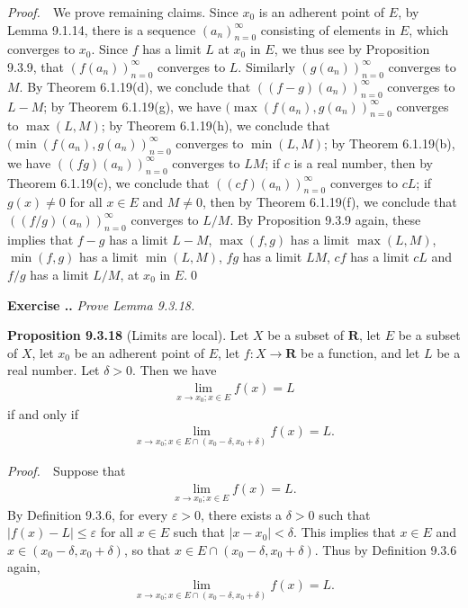 \documentclass{book}
\newcommand{\pff}{\vspace{.25em}\noindent\emph{Proof.}~~}
\newcommand{\titl}[1]{\noindent\textbf{#1}}
\newcounter{Exercise}[section]
\renewcommand{\theExercise}{\thesection.\arabic{Exercise}.}
\newcommand{\new}{\vspace{1.5em}\noindent\textbf{{Exercise \stepcounter{Exercise}\textbf{\theExercise}}} }
\begin{document}
\pff We prove remaining claims. Since $x_0$ is an adherent point of $E$, by Lemma 9.1.14, there is a sequence $(a_n)_{n=0}^{\infty}$ consisting of elements in $E$, which converges to $x_0$. Since $f$ has a limit $L$ at $x_0$ in $E$, we thus see by Proposition 9.3.9, that $(f(a_n))_{n=0}^{\infty}$ converges to $L$. Similarly $(g(a_n))_{n=0}^{\infty}$ converges to $M$.
By Theorem 6.1.19(d), we conclude that $((f-g)(a_n))_{n=0}^{\infty}$ converges to $L-M$;
by Theorem 6.1.19(g), we have $(\max(f(a_n),g(a_n))_{n=0}^{\infty}$ converges to $\max(L,M)$;
by Theorem 6.1.19(h), we conclude that $(\min(f(a_n),g(a_n))_{n=0}^{\infty}$ converges to $\min(L,M)$;
by Theorem 6.1.19(b), we have $((fg)(a_n))_{n=0}^{\infty}$ converges to $LM$;
if $c$ is a real number, then by Theorem 6.1.19(c), we conclude that $((cf)(a_n))_{n=0}^{\infty}$ converges to $cL$;
if $g(x)\neq 0$ for all $x\in E$ and $M\neq 0$, then by Theorem 6.1.19(f), we conclude that $((f/g)(a_n))_{n=0}^{\infty}$ converges to $L/M$.
By Proposition 9.3.9 again, these implies that $f-g$ has a limit $L-M$, $\max(f,g)$ has a limit $\max(L,M)$, $\min(f,g)$ has a limit $\min(L,M)$, $fg$ has a limit $LM$, $cf$ has a limit $cL$ and $f/g$ has a limit $L/M$, at $x_0$ in $E$.\qed

\new\emph{Prove Lemma 9.3.18.}

\begin{framed}
\titl{Proposition 9.3.18} (Limits are local). Let $X$ be a subset of $\mathbf{R}$, let $E$ be a subset of $X$, let $x_0$ be an adherent point of $E$, let $f:X\to\mathbf{R}$ be a function, and let $L$ be a real number. Let $\delta>0$. Then we have
    \begin{align*}
        \lim_{x\to x_0;x\in E}f(x)=L
    \end{align*}
if and only if
    \begin{align*}
        \lim_{x\to x_0;x\in E\cap(x_0-\delta,x_0+\delta)}f(x)=L.
    \end{align*}
\end{framed}

\pff Suppose that
    \begin{align*}
        \lim_{x\to x_0;x\in E}f(x)=L.
    \end{align*}
By Definition 9.3.6, for every $\varepsilon>0$, there exists a $\delta>0$ such that $|f(x)-L|\leq\varepsilon$ for all $x\in E$ such that $|x-x_0|<\delta$. This implies that $x\in E$ and $x\in(x_0-\delta,x_0+\delta)$, so that $x\in E\cap(x_0-\delta,x_0+\delta)$. Thus by Definition 9.3.6 again,
    \begin{align*}
        \lim_{x\to x_0;x\in E\cap(x_0-\delta,x_0+\delta)}f(x)=L.
    \end{align*}
\end{document}
